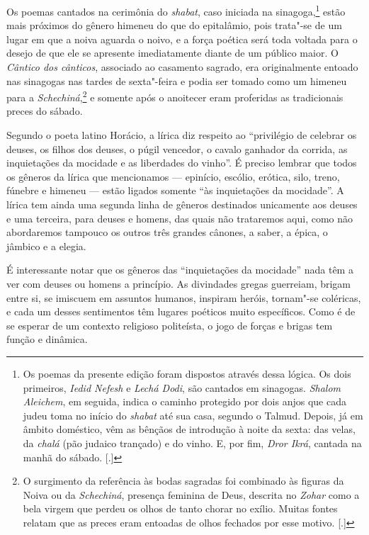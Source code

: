 Os poemas cantados na cerimônia do \emph{shabat}, caso iniciada na sinagoga,\footnote{Os poemas da presente edição foram dispostos através dessa lógica. Os dois primeiros, \emph{Iedid Nefesh} e \emph{Lechá Dodi}, são cantados em sinagogas. \emph{Shalom Aleichem}, em seguida, indica o caminho protegido por dois anjos que cada judeu toma no início do \emph{shabat} até sua casa, segundo o Talmud. Depois, já em âmbito doméstico, vêm as bênçãos de introdução à noite da sexta: das velas, da \emph{chalá} (pão judaico trançado) e do vinho. E, por fim, \emph{Dror Ikrá}, cantada na manhã do sábado. [.]}
estão mais próximos do gênero himeneu do que do epitalâmio, pois
trata"-se de um lugar em que a noiva aguarda o noivo, e a força poética
será toda voltada para o desejo de que ele se apresente imediatamente
diante de um público maior. O \emph{Cântico dos cânticos}, associado ao
casamento sagrado, era originalmente entoado nas sinagogas nas tardes de
sexta"-feira e podia ser tomado como um himeneu para a \emph{Schechiná},\footnote{O surgimento da referência às bodas sagradas foi combinado às figuras da Noiva ou da \emph{Schechiná}, presença feminina de Deus, descrita no \emph{Zohar} como a bela virgem que perdeu os olhos de tanto chorar no exílio. Muitas fontes relatam que as preces eram entoadas de olhos fechados por esse motivo. [.]}
e somente após o anoitecer eram proferidas as tradicionais preces do
sábado.

Segundo o poeta latino Horácio, a lírica diz respeito ao ``privilégio de
celebrar os deuses, os filhos dos deuses, o púgil vencedor, o cavalo
ganhador da corrida, as inquietações da mocidade e as liberdades
do vinho''. É preciso lembrar que todos os gêneros da lírica que
mencionamos --- epinício, escólio, erótica, silo, treno, fúnebre e
himeneu --- estão ligados somente ``às inquietações da
mocidade''. A lírica tem ainda uma segunda linha de gêneros destinados unicamente aos
deuses e uma terceira, para deuses e homens, das quais não trataremos
aqui, como não abordaremos tampouco os outros três grandes cânones, a
saber, a épica, o jâmbico e a elegia.

É interessante notar que os gêneros das ``inquietações da mocidade'' nada
têm a ver com deuses ou homens a princípio. As divindades gregas
guerreiam, brigam entre si, se imiscuem em assuntos humanos, inspiram
heróis, tornam"-se coléricas, e cada um desses sentimentos têm lugares
poéticos muito específicos. Como é de se esperar de um contexto
religioso politeísta, o jogo de forças e brigas tem função e dinâmica.

